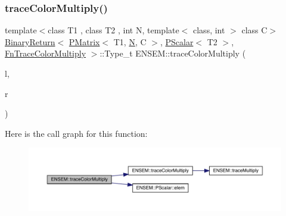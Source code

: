 \subsubsection{\texorpdfstring{traceColorMultiply()}{traceColorMultiply()}\hspace{0.1cm}{\footnotesize\ttfamily [2/3]}}
{\footnotesize\ttfamily template$<$class T1 , class T2 , int N, template$<$ class, int $>$ class C$>$ \\
\mbox{\hyperlink{structENSEM_1_1BinaryReturn}{Binary\+Return}}$<$ \mbox{\hyperlink{classENSEM_1_1PMatrix}{P\+Matrix}}$<$ T1, \mbox{\hyperlink{adat__devel_2lib_2hadron_2operator__name__util_8cc_a7722c8ecbb62d99aee7ce68b1752f337}{N}}, C $>$, \mbox{\hyperlink{classENSEM_1_1PScalar}{P\+Scalar}}$<$ T2 $>$, \mbox{\hyperlink{structENSEM_1_1FnTraceColorMultiply}{Fn\+Trace\+Color\+Multiply}} $>$\+::Type\+\_\+t E\+N\+S\+E\+M\+::trace\+Color\+Multiply (\begin{DoxyParamCaption}\item[{const \mbox{\hyperlink{classENSEM_1_1PMatrix}{P\+Matrix}}$<$ T1, \mbox{\hyperlink{adat__devel_2lib_2hadron_2operator__name__util_8cc_a7722c8ecbb62d99aee7ce68b1752f337}{N}}, C $>$ \&}]{l,  }\item[{const \mbox{\hyperlink{classENSEM_1_1PScalar}{P\+Scalar}}$<$ T2 $>$ \&}]{r }\end{DoxyParamCaption})\hspace{0.3cm}{\ttfamily [inline]}}

Here is the call graph for this function\+:\nopagebreak
\begin{figure}[H]
\begin{center}
\leavevmode
\includegraphics[width=350pt]{df/d0a/group__primmatrix_ga34f5dfd94ab05f405e04e73c9e342aeb_cgraph}
\end{center}
\end{figure}
\mbox{\label{group__primmatrix_gad73631cec5794d9c294bbf815af14cc0}} 
